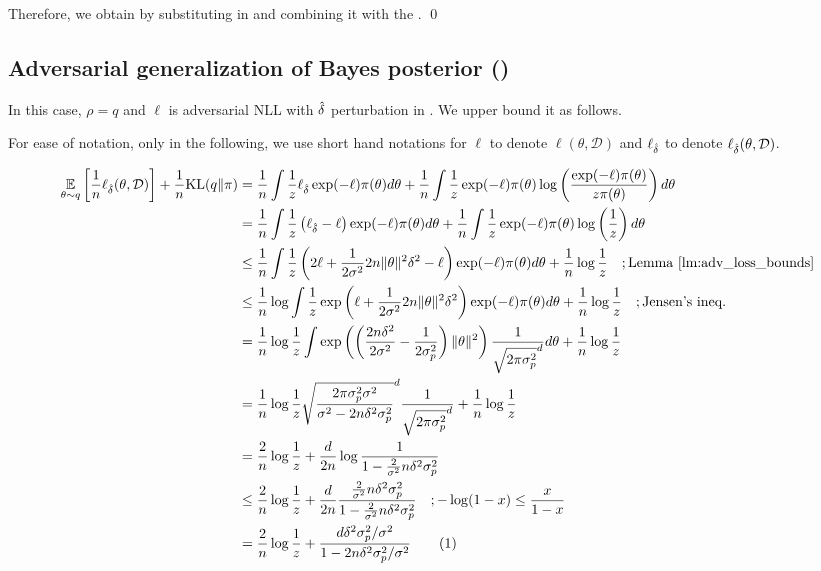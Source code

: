 Therefore, we obtain  by substituting  in  and combining it with the .
\qed

\subsection{Adversarial generalization of Bayes posterior (\MakeLowercase{)}}

In this case, $\rho = q$ and $\ell$ is adversarial NLL with $\hat{\delta}$ perturbation in . We upper bound it as follows.

For ease of notation, only in the following, we use short hand notations for $\ell$ to denote $\ell(\theta, \mathcal{D})$ and $\ell_{\hat{\delta}}$ to denote $\ell_{\hat{\delta}}(\theta, \mathcal{D})$.

\begin{align*}
    \expectation{\theta \sim {{q}}}{\frac{1}{n} \ell_{\deltat} (\theta, \mathcal{D})} + \frac{1}{n} \mathrm{KL}({{q}} \| \pi) 
    &= \frac{1}{n} \int \frac{1}{{z}}\ell_{\deltat}\exp(-{\ell})\pi(\theta) d\theta + \frac{1}{n} \int \frac{1}{{z}} \exp(-{\ell})\pi(\theta) \log \lp \frac{\exp(-{\ell})\pi(\theta)}{{z}\pi(\theta)} \rp d\theta \\
    &= \frac{1}{n} \int \frac{1}{{z}}\lp \ell_{\deltat} - \ell \rp\exp(-{\ell})\pi(\theta) d\theta + \frac{1}{n} \int \frac{1}{{z}} \exp(-{\ell})\pi(\theta) \log \lp \frac{1}{{z}} \rp d\theta \\
    &\leq \frac{1}{n} \int \frac{1}{{z}}\lp 2\ell +  {\frac{1}{2\sigma^2}} 2n \|\theta\|^2 \delta^2 - \ell \rp\exp(-{\ell})\pi(\theta) d\theta + \frac{1}{n} \log \frac{1}{{z}} \quad; \text{Lemma \ref{lm:adv_loss_bounds}} \\
    &\leq \frac{1}{n} \log \int \frac{1}{{z}} \exp \lp \ell +  {\frac{1}{2\sigma^2}}2n \|\theta\|^2 \delta^2 \rp \exp(-{\ell})\pi(\theta) d\theta +  \frac{1}{n} \log \frac{1}{{z}} \quad; \text{Jensen's ineq.} \\
    &= \frac{1}{n} \log \frac{1}{{z}} \int  \exp \lp \lp \frac{2n \delta^2}{ {2\sigma^2}} - \frac{1}{2\sigma_p^2} \rp \|\theta\|^2  \rp \frac{1}{\sqrt{2\pi \sigma_p^2}^d} d\theta +  \frac{1}{n} \log \frac{1}{{z}} \\
    &= \frac{1}{n} \log \frac{1}{{z}} \sqrt{\frac{2\pi \sigma_p^2 {\sigma^2}}{ {\sigma^2}- {2}n\delta^2 \sigma_p^2}}^d \frac{1}{\sqrt{2\pi \sigma_p^2}^d} +   \frac{1}{n} \log \frac{1}{{z}} \\
    &=  \frac{2}{n} \log \frac{1}{{z}} + \frac{d}{2n} \log \frac{1}{1- {\frac{2}{\sigma^2}}n\delta^2 \sigma_p^2} \\
    &\leq  \frac{2}{n} \log \frac{1}{{z}} + \frac{d}{2n} \frac{ {\frac{2}{\sigma^2}}n\delta^2 \sigma_p^2}{1- {\frac{2}{\sigma^2}}n\delta^2 \sigma_p^2} \quad; -\log(1-x) \leq \frac{x}{1-x} \\
    &= \frac{2}{n} \log \frac{1}{{z}} + \frac{d\delta^2 \sigma_p^2 {/\sigma^2}}{1-2n\delta^2 \sigma_p^2 {/\sigma^2}} \stepcounter{equation}\tag{\theequation}\label{eq:std_post_adv_loss_normz}
\end{align*}

